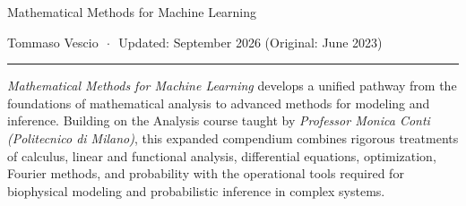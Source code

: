 \documentclass[11pt]{report}
\theoremstyle{bolddefinition}
\theoremstyle{boldplain}
\theoremstyle{boldremark}
\begin{document}
\pagestyle{plain}     

\begin{center}
    {\linespread{1.1}\selectfont
    {\huge Mathematical Methods for Machine Learning\\} 
    }
    \vspace{0.4cm}
    {\large{Tommaso Vescio $\,\cdot\,$ Updated: September 2026 (Original: June 2023)} \par}
\end{center}

\vspace{0.2cm}

\hrule
\vspace{0.15cm}
{\large{\textit{Mathematical Methods for Machine Learning} develops a unified pathway from the foundations of mathematical analysis to advanced methods for modeling and inference. Building on the Analysis course taught by \textit{Professor Monica Conti (Politecnico di Milano)}, this expanded compendium combines rigorous treatments of calculus, linear and functional analysis, differential equations, optimization, Fourier methods, and probability with the operational tools required for biophysical modeling and probabilistic inference in complex systems.} \par}

\renewcommand{\contentsname}{\LARGE\textbf{Contents}} 
\tableofcontents 
\newpage

\pagestyle{fancy}
\fancyhf{}              
\fancyhead[R]{\small\nouppercase{\rightmark}}
\fancyfoot[C]{\thepage}


\newpage

\newpage

\newpage

\newpage

\newpage

\newpage

\newpage

\newpage

\newpage

\newpage

\newpage

\newpage

\newpage

\newpage

\clearpage

\end{document}
